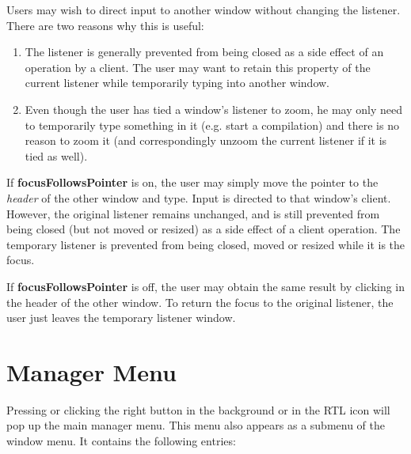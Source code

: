 Users may wish to direct input to another window without
changing the listener.  There are two reasons why this is useful:

\begin{enumerate}
\item The listener is generally prevented from being closed as a side effect
of an operation by a client.  The user may want to retain this property
of the current listener while temporarily typing into another window.

\item Even though the user has tied a window's listener to zoom, he may only need
to temporarily type something in it (e.g. start a compilation) and there
is no reason to zoom it (and correspondingly unzoom the current listener if
it is tied as well).
\end{enumerate}

If {\bf focusFollowsPointer} is on, the user may simply move the
pointer to the {\it header} of the other window and type.
Input is directed to that window's client.
However, the original listener remains unchanged, and
is still prevented from being closed (but not moved or resized) as a
side effect of a client operation.
The temporary listener is prevented
from being closed, moved or resized while it is the focus.

If {\bf focusFollowsPointer} is off, the user may obtain the same
result by clicking in the header of the other window.  To return the
focus to the original listener, the user just leaves the temporary listener
window.

\section{Manager Menu}

Pressing or clicking the right button in the background or in the RTL
icon will pop up the main manager menu.  This menu also appears as a
submenu of the window menu.  It contains the following entries:

